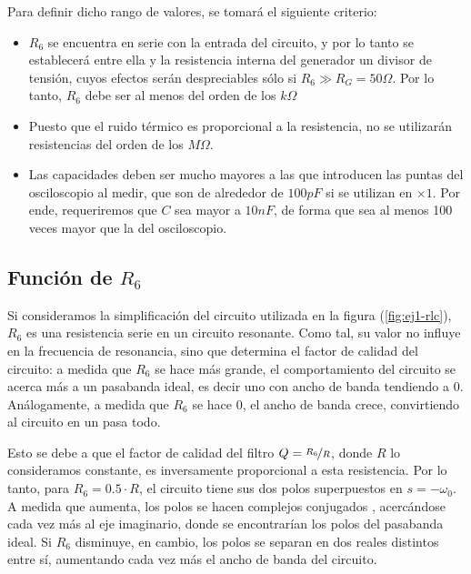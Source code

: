 \documentclass[../../tc_tp3_main.tex]{subfiles}
\begin{document}
 Para definir dicho rango de valores, se tomar\'a el siguiente criterio:
 
 \begin{itemize}
	\item  $R_6$ se encuentra en serie con la entrada del circuito, y por lo tanto se establecer\'a entre ella y la resistencia interna del generador un divisor de tensi\'on, cuyos efectos ser\'an despreciables s\'olo si $R_6 \gg R_G = 50\Omega$. Por lo tanto, $R_6$ debe ser al menos del orden de los $k \Omega$
	\item Puesto que el ruido t\'ermico es proporcional a la resistencia, no se utilizar\'an resistencias del orden de los $M\Omega$.
  	\item Las capacidades deben ser mucho mayores a las que introducen las puntas del osciloscopio al medir, que son de alrededor de $100pF$ si se utilizan en $\times 1$. Por ende, requeriremos que $C$ sea mayor a $10nF$, de forma que sea al menos 100 veces mayor que la del osciloscopio. 
 \end{itemize}


\subsection{Funci\'on de $R_6$}


Si consideramos la simplificaci\'on del circuito utilizada en la figura (\ref{fig:ej1-rlc}), $R_6$ es una resistencia serie en un circuito resonante. Como tal, su valor no influye en la frecuencia de resonancia, sino que determina el factor de calidad del circuito: a medida que $R_6$ se hace m\'as grande, el comportamiento del circuito se acerca m\'as a un pasabanda ideal, es decir uno con ancho de banda tendiendo a 0. An\'alogamente, a medida que $R_6$ se hace 0, el ancho de banda crece, convirtiendo al circuito en un pasa todo. \par

Esto se debe a que el factor de calidad del filtro $Q = \nicefrac{R_6}{R}$, donde $R$ lo consideramos constante, es inversamente proporcional a esta resistencia. Por lo tanto, para $R_6=0.5\cdot R$, el circuito tiene sus dos polos superpuestos en $s = -\omega_0$. A medida que aumenta, los polos se hacen complejos conjugados , acerc\'andose cada vez m\'as al eje imaginario, donde se encontrar\'ian los polos del pasabanda ideal. Si $R_6$ disminuye, en cambio, los polos se separan en dos reales distintos entre s\'i,   aumentando cada vez m\'as el ancho de banda del circuito. \par
\end{document}
